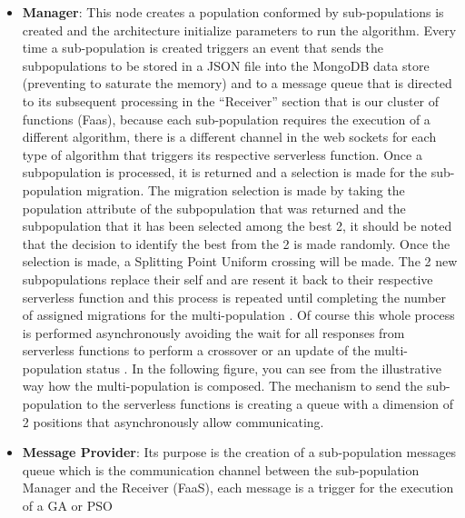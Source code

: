 \documentclass[runningheads]{llncs}
\begin{document}
\begin{itemize}
  \item {\bf Manager}: This node creates a population conformed by sub-populations is created and the architecture
  initialize parameters to run the algorithm. Every time a sub-population is
  created triggers an event that sends the subpopulations to be stored in a 
  JSON file into the MongoDB data store (preventing to saturate the
  memory) %
  and to a message queue
  that is directed to its subsequent processing in the “Receiver” section that
  is our cluster of functions (Faas), because each sub-population requires the
  execution of a different algorithm, there is a different channel in the web
  sockets for each type of algorithm that triggers its respective serverless
  function. Once a subpopulation is processed, it is returned and a selection is
  made for the sub-population migration. The migration selection is made by
  taking the population attribute of the subpopulation that was returned and the
  subpopulation that it has been selected among the best 2, it should be noted
  that the decision to identify the best from the 2 is made randomly. Once the
  selection is made, a Splitting Point Uniform crossing will be made. The 2 new
  subpopulations replace their self and are resent it back to their respective
  serverless function and this process is repeated until completing the number
  of assigned migrations for the multi-population
  \cite{Ma2019,Santander-jim2018}. Of course this whole process is performed
  asynchronously avoiding the wait for all responses from serverless functions
  to perform a crossover or an update of the multi-population status
  \cite{Lovbjerg2001,Jimeno2019}. In the following figure, you can see from the
  illustrative way how the multi-population is composed.
  The mechanism to send the sub-population to the serverless functions is
 creating a queue with a dimension of 2 positions that asynchronously allow
 communicating.
\item {\bf Message Provider}: Its purpose is the creation of a sub-population messages
  queue which is the communication channel %
  between the sub-population Manager and
the Receiver (FaaS), each message is a trigger for the execution of a GA or PSO

\end{itemize}
\end{document}
